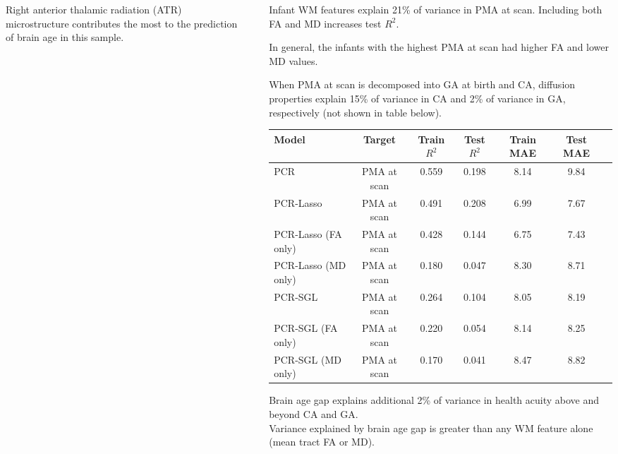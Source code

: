 \documentclass[final]{beamer}
\newlength{\sepwidth}
\newlength{\colwidth}
\newcommand{\separatorcolumn}{\begin{column}{\sepwidth}\end{column}}
\begin{document}
\begin{frame}[t]
\begin{columns}[t]
\begin{column}{\colwidth}
\begin{block}{Right anterior thalamic radiation (ATR) microstructure contributes the most to the prediction of brain age in this sample.}
  \end{block}

\end{column}

\separatorcolumn

\begin{column}{\colwidth}
  \vspace{-15pt}
  \begin{block}{Infant WM features explain 21\% of variance in PMA at scan. Including both FA and MD increases test $R^2$.}

    In general, the infants with the highest PMA at scan had higher FA and lower MD values. 
    
    When PMA at scan is decomposed into GA at birth and CA, diffusion properties explain 15\% of variance in CA and 2\% of variance in GA, respectively (not shown in table below). 
    \begin{table}[ht]
      \centering
      \fontsize{9}{11}\selectfont
      \begin{tabularx}{\textwidth}{l c c c c c c}
        \toprule
        \textbf{Model} & \textbf{Target} & \textbf{Train $R^2$} & \textbf{Test $R^2$} & \textbf{Train MAE} &
        \textbf{Test MAE} \\
        \midrule
         PCR & PMA at scan & 0.559 & 0.198 & 8.14 & 9.84 \\
        \midrule
        \rowcolor{yellow!50} PCR-Lasso & PMA at scan & 0.491 & 0.208 & 6.99 & 7.67 \\
        PCR-Lasso (FA only) & PMA at scan & 0.428 & 0.144 & 6.75 & 7.43 \\
        PCR-Lasso (MD only) & PMA at scan & 0.180 & 0.047 & 8.30 & 8.71 \\
        \midrule
        \rowcolor{yellow!50} PCR-SGL & PMA at scan & 0.264 & 0.104 & 8.05 & 8.19 \\
        PCR-SGL (FA only) & PMA at scan & 0.220 & 0.054 & 8.14 & 8.25 \\
        PCR-SGL (MD only) & PMA at scan & 0.170 & 0.041 & 8.47 & 8.82 \\
        \bottomrule
      \end{tabularx}
    \end{table}
  \end{block}

  \vspace{-15pt}
  
  \begin{block}{Brain age gap explains additional 2\% of variance in health acuity above and beyond CA and GA. \\ Variance explained by brain age gap is greater than any WM feature alone (mean tract FA or MD).}
  

\end{block}
\end{column}
\end{columns}
\end{frame}
\end{document}
